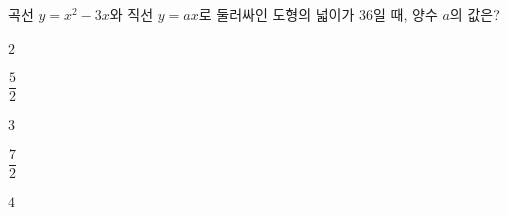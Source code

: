 곡선 $y=x^2-3x$와 직선 $y=ax$로 둘러싸인 도형의 넓이가 $36$일 때, 양수 $a$의 값은?
\begin{choices32}{\rule[-3ex]{0pt}{8ex}$2$}{\rule[-3ex]{0pt}{8ex}$\dfrac{5}{2}$}{\rule[-3ex]{0pt}{8ex}$3$}{\rule[-3ex]{0pt}{8ex}$\dfrac{7}{2}$}{\rule[-3ex]{0pt}{8ex}$4$}\end{choices32}
